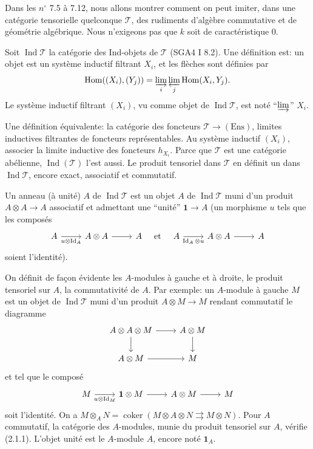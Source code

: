 \documentclass[12pt,a4paper]{article}
\theoremstyle{plain}
\theoremstyle{definition}
\DeclareMathOperator{\Hom}{Hom}
\DeclareMathOperator{\Id}{Id}
\DeclareMathOperator{\Ind}{Ind}
\DeclareMathOperator{\coker}{coker}
\newcommand{\Ens}{\mathrm{Ens}}
\begin{document}
Dans les $n^\circ$ 7.5 à 7.12, nous allons montrer comment on peut imiter, dans une catégorie tensorielle quelconque $\mathcal{T}$, des rudiments d'algèbre commutative et de géométrie algébrique. Nous n'exigeons pas que $k$ soit de caractéristique 0.

Soit $\Ind\mathcal{T}$ la catégorie des Ind-objets de $\mathcal{T}$ (SGA4 I 8.2). Une définition est: un objet est un système inductif filtrant $X_i$, et les flèches sont définies par
\[
\Hom((X_i), (Y_j)) = \varinjlim_i \varprojlim_j \Hom(X_i, Y_j).
\]
Le système inductif filtrant $(X_i)$, vu comme objet de $\Ind\mathcal{T}$, est noté ``$\varinjlim$'' $X_i$.

Une définition équivalente: la catégorie des foncteurs $\mathcal{T} \to (\Ens)$, limites inductives filtrantes de foncteurs représentables. Au système inductif $(X_i)$, associer la limite inductive des foncteurs $h_{X_i}$. Parce que $\mathcal{T}$ est une catégorie abélienne, $\Ind(\mathcal{T})$ l'est aussi. Le produit tensoriel dans $\mathcal{T}$ en définit un dans $\Ind\mathcal{T}$, encore exact, associatif et commutatif.

Un anneau (à unité) $A$ de $\Ind\mathcal{T}$ est un objet $A$ de $\Ind\mathcal{T}$ muni d'un produit $A \otimes A \to A$ associatif et admettant une ``unité'' $\mathbf{1} \to A$ (un morphisme $u$ tels que les composés
\[
\begin{tikzcd}
A \arrow[r, "u \otimes \Id_A"'] & A \otimes A \arrow[r] & A
\end{tikzcd}
\quad\text{et}\quad
\begin{tikzcd}
A \arrow[r, "\Id_A \otimes u"'] & A \otimes A \arrow[r] & A
\end{tikzcd}
\]
soient l'identité).

On définit de façon évidente les $A$-modules à gauche et à droite, le produit tensoriel sur $A$, la commutativité de $A$. Par exemple: un $A$-module à gauche $M$ est un objet de $\Ind\mathcal{T}$ muni d'un produit $A \otimes M \to M$ rendant commutatif le diagramme
\[
\begin{tikzcd}
A \otimes A \otimes M \arrow[r] \arrow[d] & A \otimes M \arrow[d] \\
A \otimes M \arrow[r] & M
\end{tikzcd}
\]
et tel que le composé
\[
\begin{tikzcd}
M \arrow[r, "u \otimes \Id_M"'] & \mathbf{1} \otimes M \arrow[r] & A \otimes M \arrow[r] & M
\end{tikzcd}
\]
soit l'identité. On a $M \otimes_A N = \coker(M \otimes A \otimes N \rightrightarrows M \otimes N)$. Pour $A$ commutatif, la catégorie des $A$-modules, munie du produit tensoriel sur $A$, vérifie (2.1.1). L'objet unité est le $A$-module $A$, encore noté $\mathbf{1}_A$.
\end{document}
